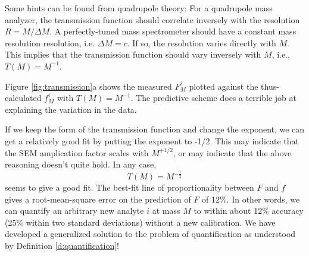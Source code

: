 Some hints can be found from quadrupole theory\cite{Douglas2009}: For a quadrupole mass analyzer, the transmission function should correlate inversely with the resolution $R = M / \Delta M$. A perfectly-tuned mass spectrometer should have a constant mass resolution resolution, i.e. $\Delta M = c$. If so, the resolution varies directly with $M$. This implies that the transmission function should vary inversely with $M$, i.e., $T(M)=M^{-1}$.

Figure \ref{fig:transmission}a shows the measured $F_M^i$ plotted against the thus-calculated $f_M^i$ with $T(M)=M^{-1}$. The predictive scheme does a terrible job at explaining the variation in the data.

If we keep the form of the transmission function and change the exponent, we can get a relatively good fit by putting the exponent to -1/2. This may indicate that the SEM amplication factor scales with $M^{+1/2}$, or may indicate that the above reasoning doesn't quite hold. In any case, 
\begin{equation}
T(M)=M^{-\frac{1}{2}}
\end{equation}
seems to give a good fit. The best-fit line of proportionality between $F$ and $f$ gives a root-mean-square error on the prediction of $F$ of 12\%. In other words, we can quantify an arbitrary new analyte $i$ at mass $M$ to within about 12\% accuracy (25\% within two standard deviations) without a new calibration. We have developed a generalized solution to the problem of quantification as understood by Definition \ref{d:quantification}!
\vspace{5mm}

